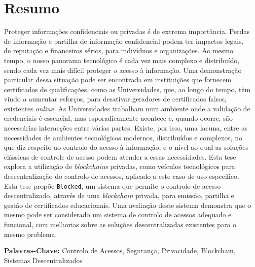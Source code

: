 \section*{Resumo}

Proteger informações confidenciais ou privadas é de extrema importância. Perdas de informação e partilha de informação confidencial podem ter impactos legais, de reputação e financeiros sérios, para indivíduos e organizações. Ao mesmo tempo, o nosso panorama tecnológico é cada vez mais complexo e distribuído, sendo cada vez mais difícil proteger o acesso à informação. Uma demonstração particular dessa situação pode ser encontrada em instituições que fornecem certificados de qualificações, como as Universidades, que, ao longo do tempo, têm vindo a aumentar esforços, para desativar geradores de certificados falsos, existentes \emph{online}. As Universidades trabalham num ambiente onde a validação de credenciais é essencial, mas esporadicamente acontece e, quando ocorre, são necessárias interacções entre várias partes. Existe, por isso, uma lacuna, entre as necessidades de ambientes tecnológicos modernos, distribuídos e complexos, no que diz respeito ao controlo do acesso à informação, e o nível ao qual as soluções clássicas de controle de acesso podem atender a essas necessidades. Esta tese explora a utilização de \emph{blockchains} privadas, como veículos tecnológicos para descentralização do controlo de acessos, aplicado a este caso de uso específico. Esta tese propõe \texttt{Blocked}, um sistema que permite o controlo de acesso descentralizado, através de uma \emph{blockchain} privada, para emissão, partilha e gestão de certificados educacionais. Uma avaliação deste sistema demonstra que o mesmo pode ser considerado um sistema de controlo de acessos adequado e funcional, com melhorias sobre as soluções descentralizadas existentes para o mesmo problema.

\vfill

\noindent \textbf{Palavras-Chave:} Controlo de Acessos, Segurança, Privacidade, Blockchain, Sistemas Descentralizados 